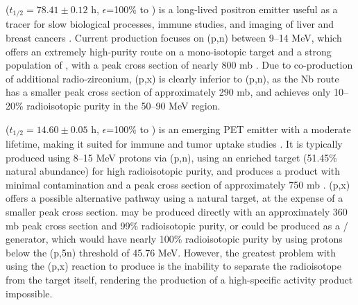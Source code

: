\documentclass[%
 reprint,
superscriptaddress,
onecolumn,
linenumbers,
notitlepage,
 amsmath,amssymb,
 aps,
prc,
]{revtex4-1}
\begin{document}
 ($t_{1/2}=78.41\pm0.12$ h, $\epsilon$=100\% to   \cite{Singh2013}) is a long-lived positron emitter useful as a tracer for slow biological processes, immune studies, and imaging of liver and  breast cancers \cite{Verel2003,Dijkers2009,Dijkers2010}.
Current production focuses on (p,n) between 9--14 MeV, which offers an extremely high-purity route on a mono-isotopic target and a strong population of , with a peak cross section of nearly 800 mb   \cite{PhysRevC.38.1624,Omara2009}.
Due to co-production of additional  radio-zirconium,  (p,x) is clearly inferior to  (p,n), as the Nb route has a smaller peak cross section of approximately 290 mb, and achieves only 10--20\% radioisotopic purity in the 50--90 MeV region.




 ($t_{1/2}=14.60 \pm 0.05$ h, $\epsilon$=100\% to   \cite{Browne1997}) is an emerging PET emitter with a moderate lifetime, making it suited for immune and tumor uptake studies    \cite{Busse2002,Radchenko2012}.
It is typically produced using 8--15 MeV protons via (p,n), using an enriched target (51.45\% natural abundance) for high radioisotopic purity, and produces a product with minimal contamination and a peak cross section of approximately 750 mb  \cite{Busse2002}.
(p,x) offers a possible alternative pathway using a natural target, at the expense of a smaller peak cross section.
 may be produced directly with an approximately 360 mb peak cross section and 99\% radioisotopic purity, or could be produced as a / generator, which would have nearly 100\% radioisotopic purity by using protons below the (p,5n) threshold of 45.76 MeV.
However, the greatest problem with using the (p,x) reaction to produce  is the inability to separate the radioisotope from the target itself, rendering the production of a high-specific activity product impossible.  
\end{document}
